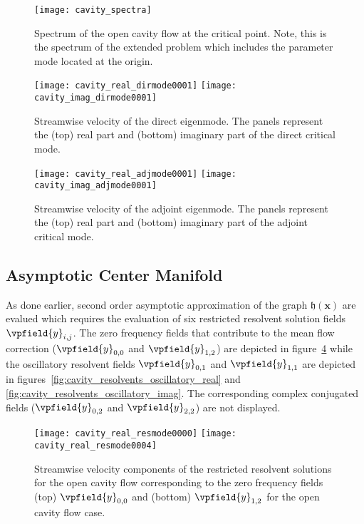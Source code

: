 \begin{figure}
	\centering
	\texttt{[image: cavity\_spectra]}
	\caption{Spectrum of the open cavity flow at the critical point. Note, this is the spectrum of the extended problem which includes the parameter mode located at the origin.}
	\label{fig:cavity_spectrum}
\end{figure}	

\begin{figure}
	\texttt{[image: cavity\_real\_dirmode0001]}
	\texttt{[image: cavity\_imag\_dirmode0001]}
	\caption{Streamwise velocity of the direct eigenmode. The panels represent the (top) real part and (bottom) imaginary part of the direct critical mode.}
	\label{fig:cavity_flowconfig}
\end{figure}

\begin{figure}
	\texttt{[image: cavity\_real\_adjmode0001]}
	\texttt{[image: cavity\_imag\_adjmode0001]}
	\caption{Streamwise velocity of the adjoint eigenmode. The panels represent the (top) real part and (bottom) imaginary part of the adjoint critical mode.}
	\label{fig:cavity_flowconfig_2}
\end{figure}

\subsection{Asymptotic Center Manifold}

As done earlier, second order asymptotic approximation of the graph $\mathfrak{h}(\mathbf{x})$ are evalued which requires the evaluation of six restricted resolvent solution fields $\vpfield{y}_{i,j}$. The zero frequency fields that contribute to the mean flow correction ($\vpfield{y}_{0,0}$ and $\vpfield{y}_{1,2}$) are depicted in figure~\ref{fig:cavity_resolvents_zero} while the oscillatory resolvent fields $\vpfield{y}_{0,1}$ and $\vpfield{y}_{1,1}$ are depicted in figures~\ref{fig:cavity_resolvents_oscillatory_real} and \ref{fig:cavity_resolvents_oscillatory_imag}. The corresponding complex conjugated fields ($\vpfield{y}_{0,2}$ and $\vpfield{y}_{2,2}$) are not displayed.
\begin{figure}
	\centering
	\texttt{[image: cavity\_real\_resmode0000]}
	\texttt{[image: cavity\_real\_resmode0004]}
	\caption{Streamwise velocity components of the restricted resolvent solutions for the open cavity flow corresponding to the zero frequency fields (top) $\vpfield{y}_{0,0}$ and (bottom) $\vpfield{y}_{1,2}$ for the open cavity flow case.}
	\label{fig:cavity_resolvents_zero}
\end{figure}

